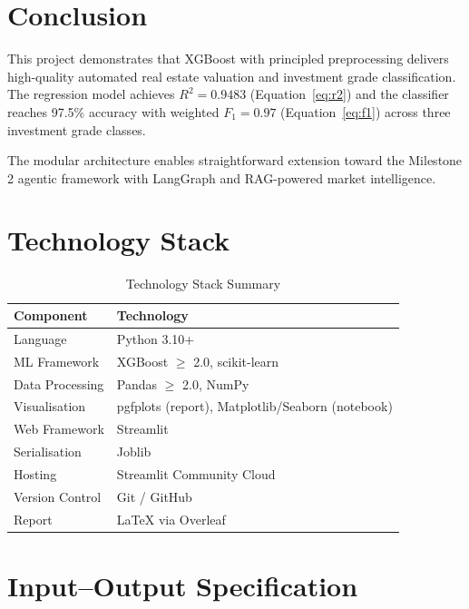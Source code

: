 \documentclass[12pt,a4paper]{article}
\begin{document}
\section{Conclusion}

This project demonstrates that XGBoost with principled preprocessing delivers
high-quality automated real estate valuation and investment grade classification.
The regression model achieves $R^2 = 0.9483$ (Equation~\ref{eq:r2}) and the
classifier reaches 97.5\% accuracy with weighted $F_1 = 0.97$
(Equation~\ref{eq:f1}) across three investment grade classes.

The modular architecture enables straightforward extension toward the Milestone 2
agentic framework with LangGraph and RAG-powered market intelligence.

\appendix

\section{Technology Stack}

\begin{table}[H]
\centering
\caption{Technology Stack Summary}
\begin{tabular}{@{} l l @{}}
\toprule
\textbf{Component} & \textbf{Technology} \\
\midrule
Language         & Python 3.10+                \\
ML Framework     & XGBoost $\geq$ 2.0, scikit-learn \\
Data Processing  & Pandas $\geq$ 2.0, NumPy   \\
Visualisation    & pgfplots (report), Matplotlib/Seaborn (notebook) \\
Web Framework    & Streamlit                   \\
Serialisation    & Joblib                      \\
Hosting          & Streamlit Community Cloud   \\
Version Control  & Git / GitHub                \\
Report           & LaTeX via Overleaf        \\
\bottomrule
\end{tabular}
\end{table}

\section{Input--Output Specification}
\end{document}
